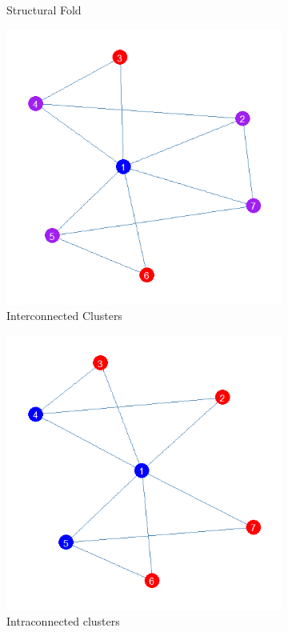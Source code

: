 \documentclass[12pt]{article}
\begin{document}
\begin{figure}[ht!]
\begin{subfigure}[b]{0.45\textwidth}
            \caption{Structural Fold}
            \label{fig:sf}
    \end{subfigure}
     \begin{subfigure}[b]{0.45\textwidth}
        \includegraphics[width=1.0\textwidth]{Plots/inter.png}
            \caption{Interconnected Clusters}
            \label{fig:inter}
    \end{subfigure}
     \begin{subfigure}[b]{0.45\textwidth}
        \includegraphics[width=1.0\textwidth]{Plots/intra.png}
            \caption{Intraconnected clusters}
            \label{fig:intra}
    \end{subfigure}
    \caption{}
    \label{fig:toys}
\end{figure}
\end{document}
